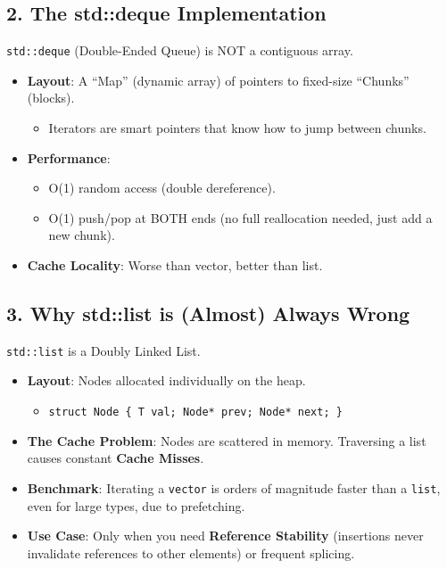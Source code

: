 \hypertarget{the-stddeque-implementation}{%
\subsection{2. The std::deque
Implementation}\label{the-stddeque-implementation}}

\passthrough{\lstinline!std::deque!} (Double-Ended Queue) is NOT a
contiguous array.

\begin{itemize}
\tightlist
\item
  \textbf{Layout}: A ``Map'' (dynamic array) of pointers to fixed-size
  ``Chunks'' (blocks).

  \begin{itemize}
  \tightlist
  \item
    Iterators are smart pointers that know how to jump between chunks.
  \end{itemize}
\item
  \textbf{Performance}:

  \begin{itemize}
  \tightlist
  \item
    O(1) random access (double dereference).
  \item
    O(1) push/pop at BOTH ends (no full reallocation needed, just add a
    new chunk).
  \end{itemize}
\item
  \textbf{Cache Locality}: Worse than vector, better than list.
\end{itemize}

\hypertarget{why-stdlist-is-almost-always-wrong}{%
\subsection{3. Why std::list is (Almost) Always
Wrong}\label{why-stdlist-is-almost-always-wrong}}

\passthrough{\lstinline!std::list!} is a Doubly Linked List.

\begin{itemize}
\tightlist
\item
  \textbf{Layout}: Nodes allocated individually on the heap.

  \begin{itemize}
  \tightlist
  \item
    \passthrough{\lstinline!struct Node \{ T val; Node* prev; Node* next; \}!}
  \end{itemize}
\item
  \textbf{The Cache Problem}: Nodes are scattered in memory. Traversing
  a list causes constant \textbf{Cache Misses}.
\item
  \textbf{Benchmark}: Iterating a \passthrough{\lstinline!vector!} is
  orders of magnitude faster than a \passthrough{\lstinline!list!}, even
  for large types, due to prefetching.
\item
  \textbf{Use Case}: Only when you need \textbf{Reference Stability}
  (insertions never invalidate references to other elements) or frequent
  splicing.
\end{itemize}

